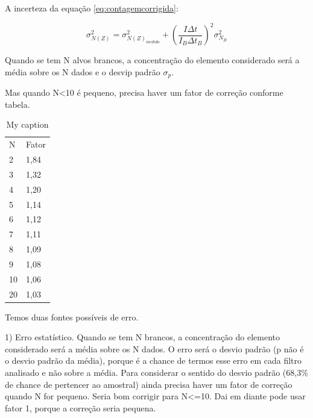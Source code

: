 A incerteza da equação \ref{eq:contagemcorrigida}:

\begin{equation}
  \label{eq:erro_contagemcorrigida}
  \sigma_{N(Z)}^2 = \sigma_{N(Z)_{medido}}^2 + \left( \frac{I \Delta t}{I_B \Delta t_B} \right)^2 \sigma_{N_B}^2
\end{equation}



Quando se tem N alvos brancos, a concentração do elemento 
considerado será a média sobre os N dados e o desvip padrão $\sigma_p$.

Mas quando N<10 é pequeno, precisa haver um fator de correção conforme tabela.

\begin{table}[H]
\centering
\caption{My caption}
\label{my-label}
\begin{tabular}{ll}
N  & Fator \\
2  & 1,84  \\
3  & 1,32  \\
4  & 1,20  \\
5  & 1,14  \\
6  & 1,12  \\
7  & 1,11  \\
8  & 1,09  \\
9  & 1,08  \\
10 & 1,06  \\
20 & 1,03 
\end{tabular}
\end{table}


Temos duas fontes possíveis de erro.

1) Erro estatístico. Quando se tem N brancos, a concentração do elemento considerado será a média sobre os N dados. O erro será o desvio padrão (p não é o desvio padrão da média), porque é a chance de termos esse erro em cada filtro analisado e não sobre a média. Para considerar o sentido do desvio padrão (68,3\% de chance de pertencer ao amostral) ainda precisa haver um fator de correção quando N for pequeno. Seria bom corrigir para N<=10. Dai em diante pode usar fator 1, porque a correção seria pequena.

